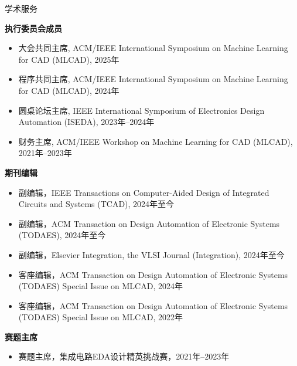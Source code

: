 
\begin{rSection}{学术服务}

\textbf{执行委员会成员}
\begin{itemize}
    \item 大会共同主席, ACM/IEEE International Symposium on Machine Learning for CAD (MLCAD), 2025年
    \item 程序共同主席, ACM/IEEE International Symposium on Machine Learning for CAD (MLCAD), 2024年
    \item 圆桌论坛主席, IEEE International Symposium of Electronics Design Automation (ISEDA), 2023年--2024年
    \item 财务主席, ACM/IEEE Workshop on Machine Learning for CAD (MLCAD), 2021年--2023年 
\end{itemize}

\textbf{期刊编辑}
\begin{itemize}
    \item 副编辑，IEEE Transactions on Computer-Aided Design of Integrated Circuits and Systems (TCAD), 2024年至今
    \item 副编辑，ACM Transaction on Design Automation of Electronic Systems (TODAES), 2024年至今
    \item 副编辑，Elsevier Integration, the VLSI Journal (Integration), 2024年至今
    \item 客座编辑，ACM Transaction on Design Automation of Electronic Systems (TODAES) Special Issue on MLCAD, 2024年
    \item 客座编辑，ACM Transaction on Design Automation of Electronic Systems (TODAES) Special Issue on MLCAD, 2022年
\end{itemize}

\textbf{赛题主席}
\begin{itemize}
    \item 赛题主席，集成电路EDA设计精英挑战赛，2021年--2023年
\end{itemize}


\end{rSection}
